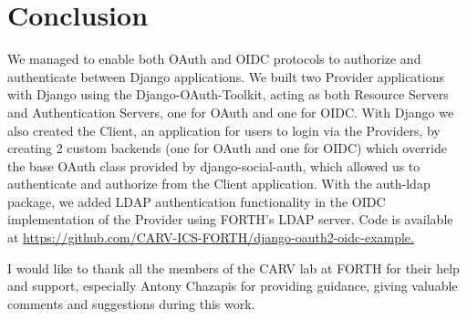 \section{Conclusion}
We managed to enable both OAuth and OIDC protocols to authorize and authenticate between Django applications. We built two Provider applications with Django using the Django-OAuth-Toolkit, acting as both Resource Servers and Authentication Servers, one for OAuth and one for OIDC. With Django we also created the Client, an application for users to login via the Providers, by creating 2 custom backends (one for OAuth and one for OIDC) which override the base OAuth class provided by django-social-auth, which allowed us to authenticate and authorize from the Client application. With the auth-ldap package, we added LDAP authentication functionality in the OIDC implementation of the Provider using FORTH's LDAP server. Code is available at \href{https://github.com/CARV-ICS-FORTH/django-oauth2-oidc-example}{https://github.com/CARV-ICS-FORTH/django-oauth2-oidc-example.}


\begin{acks}
I would like to thank all the members of the CARV lab at FORTH for their help and support, especially Antony Chazapis for providing guidance, giving valuable comments and suggestions during this work.
\end{acks}

